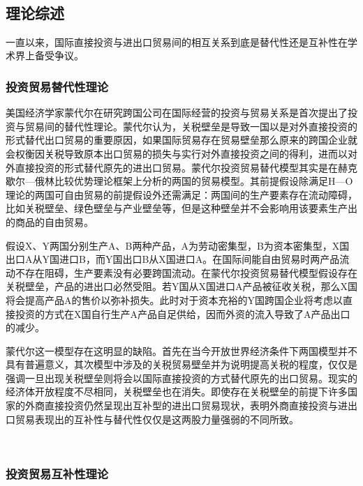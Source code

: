 \documentclass{article}
\begin{document}
{{\ }

\noindent  \subsection{理论综述}
\vspace{0.1cm}


一直以来，国际直接投资与进出口贸易间的相互关系到底是替代性还是互补性在学术界上备受争议。
{\ }

  \subsubsection{投资贸易替代性理论}
  \vspace{0.1cm}

美国经济学家蒙代尔在研究跨国公司在国际经营的投资与贸易关系是首次提出了投资与贸易间的替代性理论。蒙代尔认为，关税壁垒是导致一国以是对外直接投资的形式替代出口贸易的重要原因，如果国际贸易存在贸易壁垒那么原来的跨国企业就会权衡因关税导致原本出口贸易的损失与实行对外直接投资之间的得利，进而以对外直接投资的形式替代原先的进出口贸易。蒙代尔投资贸易替代模型其实是在赫克歇尔—俄林比较优势理论框架上分析的两国的贸易模型。其前提假设除满足H—O理论的两国可自由贸易的前提假设外还需满足：两国间的生产要素存在流动障碍，比如关税壁垒、绿色壁垒与产业壁垒等，但是这种壁垒并不会影响用该要素生产出的商品的自由贸易。

假设X、Y两国分别生产A、B两种产品，A为劳动密集型，B为资本密集型，X国出口A从Y国进口B，而Y国出口B从X国进口A。在国际间能自由贸易时两产品流动不存在阻碍，生产要素没有必要跨国流动。在蒙代尔投资贸易替代模型假设存在关税壁垒，产品的进出口必然受阻。若Y国从X国进口A产品被征收关税，那么X国将会提高产品A的售价以弥补损失。此时对于资本充裕的Y国跨国企业将考虑以直接投资的方式在X国自行生产A产品自足供给，因而外资的流入导致了A产品出口的减少。

蒙代尔这一模型存在这明显的缺陷。首先在当今开放世界经济条件下两国模型并不具有普遍意义，其次模型中涉及的关税贸易壁垒并为说明提高关税的程度，仅仅是强调一旦出现关税壁垒则将会以国际直接投资的方式替代原先的出口贸易。现实的经济体开放程度不尽相同，关税壁垒也在消失。即使存在关税壁垒的前提下许多国家的外商直接投资仍然呈现出互补型的进出口贸易现状，表明外商直接投资与进出口贸易表现出的互补性与替代性仅仅是这两股力量强弱的不同所致。

{\ }

 \subsubsection{投资贸易互补性理论}
\vspace{0.1cm}

}
\end{document}
